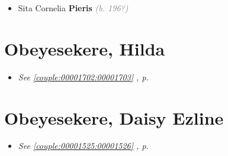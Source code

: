 \documentclass[10pt, openany]{book}
\begin{document}
\begin{itemize}
{\begin{itemize}
{\begin{itemize}
{\begin{itemize}
{\begin{itemize}
{\begin{itemize}
\item{Felix \textbf{Amarasinghe} \textcolor{gray}{\textit{(b. 199?)}}
 }
\item{Nilanthi \textbf{Amarasinghe} \textcolor{gray}{\textit{(b. 199?)}}
 }
\item{Shalini \textbf{Amarasinghe} \textcolor{gray}{\textit{(b. 199?)}}
 }
\end{itemize}}
\end{itemize}
  }
\item{Sita Cornelia \textbf{Pieris} \textcolor{gray}{\textit{(b. 196?)}}
  }
\end{itemize}}
\end{itemize}
 }
\end{itemize}}
\end{itemize}
 
\chapter{Obeyesekere, Hilda}
\label{00001703}
\textcolor{slmaroon}{\textit{}}
\begin{itemize}
\item{\textcolor{slteal}{\textit{See  \autoref{couple:00001702:00001703} \textit{, p. \pageref{couple:00001702:00001703} }}}}
\end{itemize}
 
\chapter{Obeyesekere, Daisy Ezline}
\label{00001525}
\textcolor{slmaroon}{\textit{}}
\begin{itemize}
\item{\textcolor{slteal}{\textit{See  \autoref{couple:00001525:00001526} \textit{, p. \pageref{couple:00001525:00001526} }}}}
\end{itemize}
  
\end{document}
